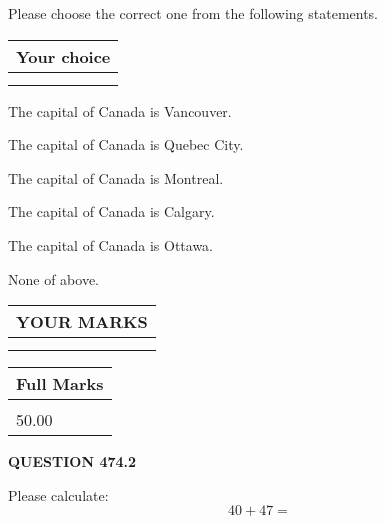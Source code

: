 \documentclass[12pt]{article}
\begin{document}
  
Please choose the correct one from the following statements.
  
  
\noindent\hspace{3.0in} \begin{tabular}{|l|}
\hline
Your choice \\
\hline
 \\ 
 \\ 
\hline
\end{tabular}
  
  
 
 
The capital of Canada is Vancouver.
 
 
The capital of Canada is Quebec City.
 
 
The capital of Canada is Montreal.
 
 
The capital of Canada is Calgary.
 
 
The capital of Canada is Ottawa.
 
 
 None of above.
 
 
  
\vspace{0.2in}
  
\noindent\begin{tabular}{|l|}
\hline
 YOUR MARKS  \\
\hline
 \\ 
 \\ 
\hline
\end{tabular}
\hspace{0.05in} \begin{tabular}{|l|}
\hline
 Full Marks  \\
\hline
 \\ 
50.00 \\
\hline
\end{tabular}
{\textbf{\Large{QUESTION
474.2 
}}}
  
  
 
Please calculate:
\begin{equation}
40 +  %
47 = \nonumber
\end{equation}
 

 

 
   
   
 \vspace{0.2in}
 
   
   
   
   
\end{document}
